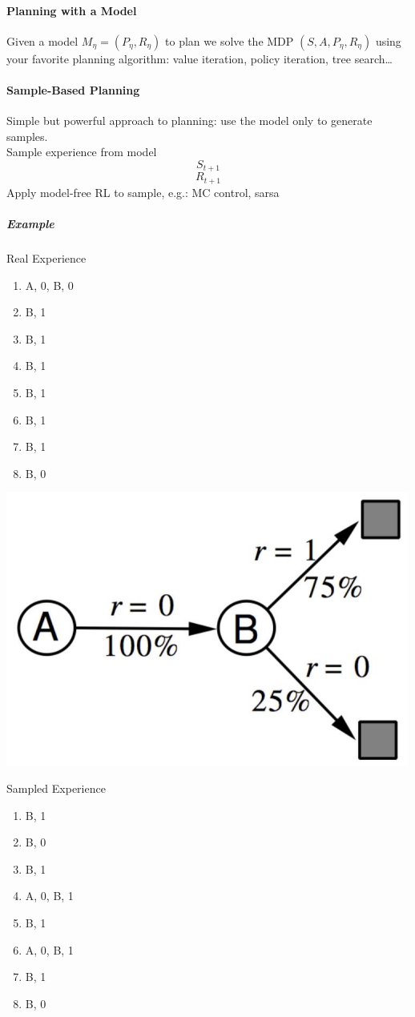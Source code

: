 \documentclass[10pt]{report}
\begin{document}
\paragraph{Planning with a Model} Given a model $M_\eta = (P_\eta, R_\eta)$ to plan we solve the MDP $(S,A,P_\eta,R_\eta)$ using your favorite planning algorithm: value iteration, policy iteration, tree search\ldots
\paragraph{Sample-Based Planning} Simple but powerful approach to planning: use the model only to generate samples.\\
Sample experience from model %
$$S_{t+1}$$
$$R_{t+1}$$
Apply model-free RL to sample, e.g.: MC control, sarsa %
\subparagraph{Example} \begin{multicols}{3}
Real Experience
\begin{enumerate}
	\item A, 0, B, 0
	\item B, 1
	\item B, 1
	\item B, 1
	\item B, 1
	\item B, 1
	\item B, 1
	\item B, 0
\end{enumerate}
\columnbreak
\begin{center}
	\includegraphics[scale=0.33]{174.png}
\end{center}
\columnbreak
Sampled Experience
\begin{enumerate}
	\item B, 1
	\item B, 0
	\item B, 1
	\item A, 0, B, 1
	\item B, 1
	\item A, 0, B, 1
	\item B, 1
	\item B, 0
\end{enumerate} %
\end{multicols}
\end{document}
